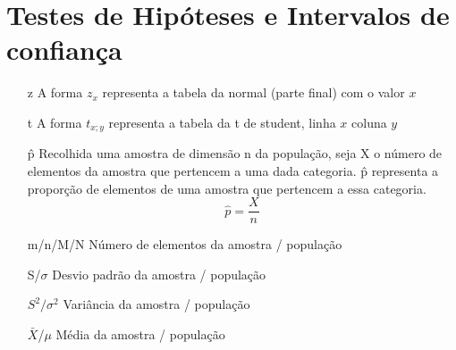 \documentclass[10pt,a4paper]{report}
\begin{document}
\section{Testes de Hipóteses e Intervalos de confiança}
\begin{itemize}
\item[z] A forma $z_x$ representa a tabela da normal (parte final) com o valor $x$
\item[t] A forma $t_{x;y}$ representa a tabela da t de student, linha $x$ coluna $y$
\item[\^p] Recolhida uma amostra de dimensão n da população, seja X o
número de elementos da amostra que pertencem a uma dada categoria. \^p representa a proporção de elementos de uma amostra que pertencem a essa categoria. $$\hat{p} = \frac{X}{n}$$
\item[m/n/M/N] Número de elementos da amostra / população
\item[S/$\sigma$] Desvio padr\~ao da amostra / população
\item[$S^2 / \sigma^2$] Variância da amostra / população
\item[$\bar{X}$/$\mu$] Média da amostra / população
\end{itemize}
\end{document}

